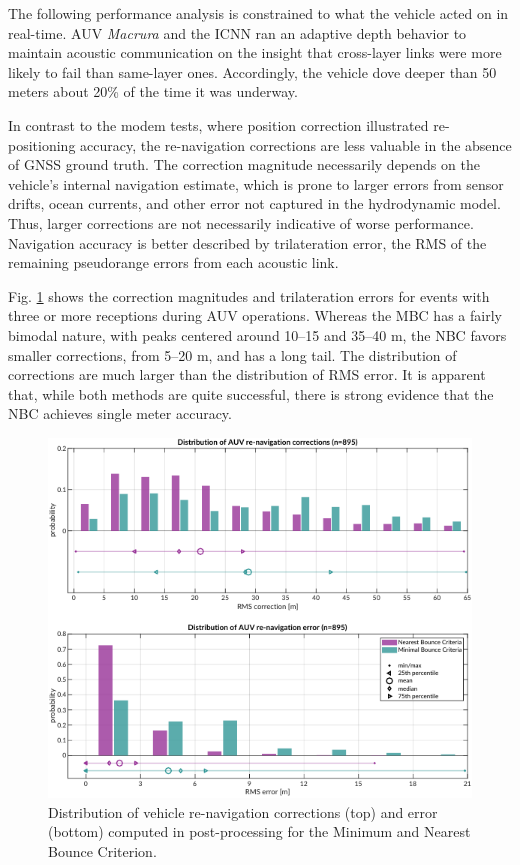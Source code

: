 The following performance analysis is constrained to what the vehicle acted on in real-time.
AUV \emph{Macrura} and the ICNN ran an adaptive depth behavior to maintain acoustic communication on the insight that cross-layer links were more likely to fail than same-layer ones.
Accordingly, the vehicle dove deeper than 50 meters about 20\% of the time it was underway.

In contrast to the modem tests, where position correction illustrated re-positioning accuracy, the re-navigation corrections are less valuable in the absence of GNSS ground truth.
The correction magnitude necessarily depends on the vehicle's internal navigation estimate, which is prone to larger errors from sensor drifts, ocean currents, and other error not captured in the hydrodynamic model.
Thus, larger corrections are not necessarily indicative of worse performance.
Navigation accuracy is better described by trilateration error, the RMS of the remaining pseudorange errors from each acoustic link.

Fig. \ref{fig:trilat-auv} shows the correction magnitudes and trilateration errors for events with three or more receptions during AUV operations.
Whereas the MBC has a fairly bimodal nature, with peaks centered around 10--15 and 35--40 m, the NBC favors smaller corrections, from 5--20 m, and has a long tail.
The distribution of corrections are much larger than the distribution of RMS error.
It is apparent that, while both methods are quite successful, there is strong evidence that the NBC achieves single meter accuracy.

\begin{figure}[!ht]
\includegraphics[width=\textwidth]{figs/auv-trilat-stat.pdf}
\caption{Distribution of vehicle re-navigation corrections (top) and error (bottom) computed in post-processing for the Minimum and Nearest Bounce Criterion.}
\label{fig:trilat-auv}
\end{figure}

